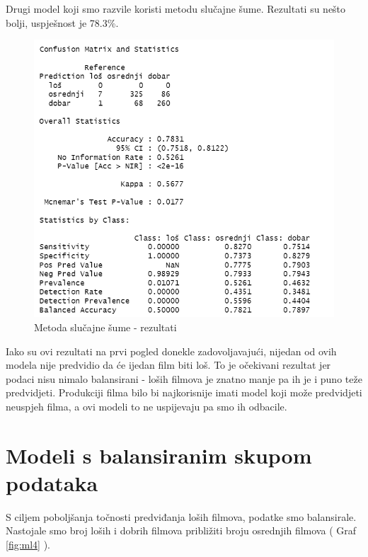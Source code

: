 Drugi model koji smo razvile koristi metodu slučajne šume. Rezultati su nešto bolji, uspješnost je 78.3\%.



\begin{figure}[H]
	\centering
	\includegraphics[width=15cm]{../figures/expl/003.png}
	\caption{Metoda slučajne šume - rezultati}
	\label{fig:ml3}
\end{figure}

Iako su ovi rezultati na prvi pogled donekle zadovoljavajući, nijedan od ovih modela nije predvidio da će ijedan film biti loš. To je očekivani rezultat jer podaci nisu nimalo balansirani - loših filmova je znatno manje pa ih je i puno teže predvidjeti. Produkciji filma bilo bi najkorisnije imati model koji može predvidjeti neuspjeh filma, a ovi modeli to ne uspijevaju pa smo ih odbacile.

\section{Modeli s balansiranim skupom podataka}

S ciljem poboljšanja točnosti predviđanja loših filmova, podatke smo balansirale. Nastojale smo broj loših i dobrih filmova približiti broju osrednjih filmova ( Graf \ref{fig:ml4} ).



